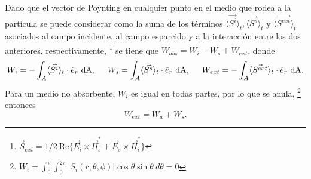  Dado que el vector de Poynting en cualquier punto en el medio que rodea a la partícula se puede considerar como la suma de los términos $\langle\Vec{S^i}\rangle_t, \langle\Vec{S^s}\rangle_t$ y $\langle\Vec{S^{ext}}\rangle_t$ \cite{Bohren} asociados al campo incidente, al campo esparcido y a la interacción entre los dos anteriores, respectivamente, \footnote{$\Vec{S}_{ext}=1/2\:\mbox{Re}\{\Vec{E}_i\times\Vec{H}_s^*+\Vec{E}_s\times\Vec{H}_i^*\}$ } se tiene que $W_{abs}=W_i-W_s+W_{ext}$, donde \cite{Bohren}
 \begin{equation}
 	W_i  = -\int_{A}\langle\Vec{S^i}\rangle_t\cdot\hat{e}_r\text{ dA},\hspace{0.5cm} W_s=\int_{A}\langle\Vec{S^s}\rangle_t\cdot\hat{e}_r\text{ dA},\hspace{0.5cm} 	W_{ext} = -\int_{A}\langle\Vec{S^{ext}}\rangle_t\cdot\hat{e}_r\text{ dA}.
 	\label{Ws}
 \end{equation}
Para un medio no absorbente, $W_i$ es igual en todas partes, por lo que se anula, \footnote{$W_i =\int_{0}^{\pi}\int_{0}^{2\pi}|S_i(r,\theta,\phi)|\cos\theta \sin\theta \: d\theta=0$} entonces
\begin{equation}
	W_{ext}=W_a+W_s.
\end{equation}


